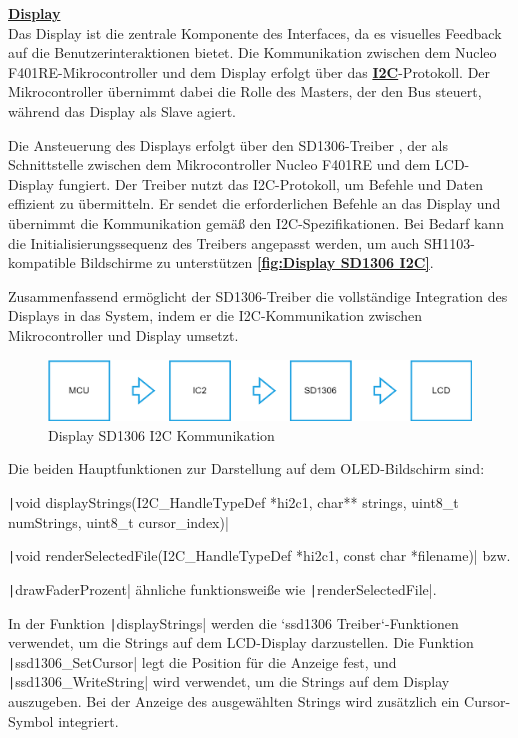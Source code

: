 \newpage	
\textbf{\hyperlink{Display}{Display}} \\

Das Display ist die zentrale Komponente des Interfaces, da es visuelles Feedback auf die Benutzerinteraktionen bietet. Die Kommunikation zwischen dem Nucleo F401RE-Mikrocontroller und dem Display erfolgt über das \textbf{\hyperlink{I2C_target}{I2C}}-Protokoll. Der Mikrocontroller übernimmt dabei die Rolle des Masters, der den Bus steuert, während das Display als Slave agiert.

Die Ansteuerung des Displays erfolgt über den SD1306-Treiber \cite{sd1306-driver}, der als Schnittstelle zwischen dem Mikrocontroller Nucleo F401RE und dem LCD-Display fungiert. Der Treiber nutzt das I2C-Protokoll, um Befehle und Daten effizient zu übermitteln. Er sendet die erforderlichen Befehle an das Display und übernimmt die Kommunikation gemäß den I2C-Spezifikationen. Bei Bedarf kann die Initialisierungssequenz des Treibers angepasst werden, um auch SH1103-kompatible Bildschirme zu unterstützen \textbf{\autoref{fig:Display SD1306 I2C}}.

Zusammenfassend ermöglicht der SD1306-Treiber die vollständige Integration des Displays in das System, indem er die I2C-Kommunikation zwischen Mikrocontroller und Display umsetzt. \\ 


\begin{figure}[H]
	\centering
	\includegraphics[width=1.0\textwidth]{images/08_durchfuehrung/interface/Display SD1306 Treiber I2C.drawio}
	\caption{Display SD1306 I2C Kommunikation}
	\label{fig:Display SD1306 I2C}
\end{figure}

Die beiden Hauptfunktionen zur Darstellung auf dem OLED-Bildschirm sind:

 \texttt|void  displayStrings(I2C_HandleTypeDef *hi2c1, char** strings, uint8_t numStrings, uint8_t cursor_index)|
 
 \texttt|void renderSelectedFile(I2C_HandleTypeDef *hi2c1, const char *filename)| bzw. 
 
 \texttt|drawFaderProzent| ähnliche funktionsweiße wie  \texttt|renderSelectedFile|. 


In der Funktion \texttt|displayStrings| werden die `ssd1306 Treiber`-Funktionen verwendet, um die Strings auf dem LCD-Display darzustellen. Die Funktion \texttt|ssd1306_SetCursor| legt die Position für die Anzeige fest, und \texttt|ssd1306_WriteString| wird verwendet, um die Strings auf dem Display auszugeben. Bei der Anzeige des ausgewählten Strings wird zusätzlich ein Cursor-Symbol integriert.

